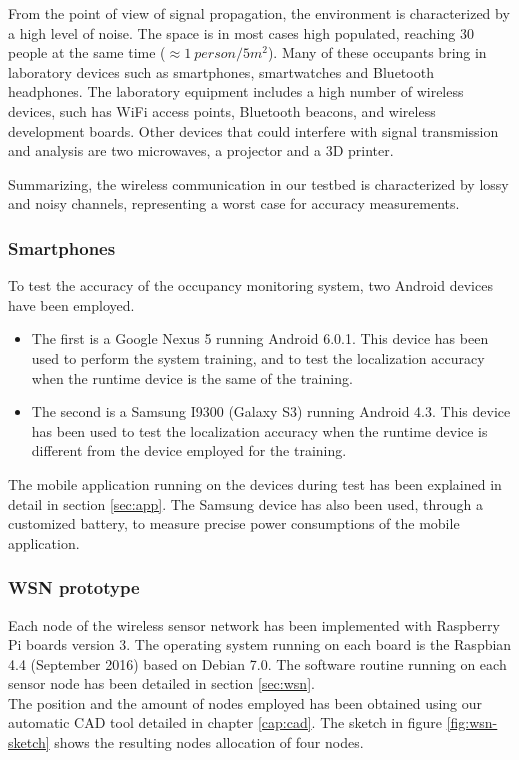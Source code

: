 From the point of view of signal propagation, the environment is characterized by a high level of noise. The space is in most cases high populated, reaching 30 people at the same time ($\approx 1 ~ person / 5m^2$).
Many of these occupants bring in laboratory devices such as smartphones, smartwatches and Bluetooth headphones.
The laboratory equipment includes a high number of wireless devices, such has WiFi access points, Bluetooth beacons, and wireless development boards. Other devices that could interfere with signal transmission and analysis are two microwaves, a projector and a 3D printer.

Summarizing, the wireless communication in our testbed is characterized by lossy and noisy channels, representing a worst case for accuracy measurements.

\subsubsection{Smartphones}
\label{sec:test-phones}
To test the accuracy of the occupancy monitoring system, two Android devices have been employed.
\begin{itemize}
\item The first is a Google Nexus 5 running Android 6.0.1. This device has been used to perform the system training, and to test the localization accuracy when the runtime device is the same of the training.
\item The second is a Samsung I9300 (Galaxy S3) running Android 4.3. This device has been used to test the localization accuracy when the runtime device is different from the device employed for the training.
\end{itemize}
The mobile application running on the devices during test has been explained in detail in section \ref{sec:app}.
The Samsung device has also been used, through a customized battery, to measure precise power consumptions of the mobile application.

\subsubsection{WSN prototype}
\label{sec:test-wsn}
Each node of the wireless sensor network has been implemented with Raspberry Pi boards version 3. The operating system running on each board is the Raspbian 4.4 (September 2016) based on Debian 7.0. The software routine running on each sensor node has been detailed in section \ref{sec:wsn}.\\
The position and the amount of nodes employed has been obtained using our automatic CAD tool detailed in chapter \ref{cap:cad}. The sketch in figure \ref{fig:wsn-sketch} shows the resulting nodes allocation of four nodes.


